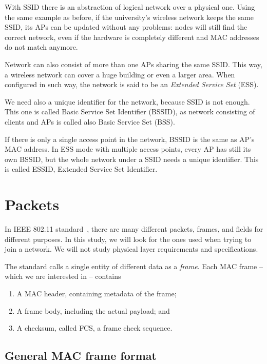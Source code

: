 \documentclass[12pt,a4paper,oneside,pdftex]{report}
\begin{document}
With SSID there is an abstraction of logical network over a physical one. Using the same example as before, if the university's wireless network keeps the same SSID, its APs can be updated without any problems: nodes will still find the correct network, even if the hardware is completely different and MAC addresses do not match anymore.

Network can also consist of more than one APs sharing the same SSID. This way, a wireless network can cover a huge building or even a larger area. When configured in such way, the network is said to be an \emph{Extended Service Set} (ESS).~\cite{IEEE802.11}

We need also a unique identifier for the network, because SSID is not enough. This one is called Basic Service Set Identifier (BSSID), as network consisting of clients and APs is called also Basic Service Set (BSS).

If there is only a single access point in the network, BSSID is the same as AP's MAC address. In ESS mode with multiple access points, every AP has still its own BSSID, but the whole network under a SSID needs a unique identifier. This is called ESSID, Extended Service Set Identifier.


\section{Packets}
\label{sec:packets_format}

In IEEE 802.11 standard~\cite{IEEE802.11}, there are many different packets, frames, and fields for different purposes. In this study, we will look for the ones used when trying to join a network. We will not study physical layer requirements and specifications.

The standard calls a single entity of different data as a \emph{frame}. Each MAC frame -- which we are interested in -- contains

\begin{enumerate}
    \item A MAC header, containing metadata of the frame;
    \item A frame body, including the actual payload; and
    \item A checksum, called FCS, a frame check sequence.
\end{enumerate}

\subsection{General MAC frame format}
\end{document}

